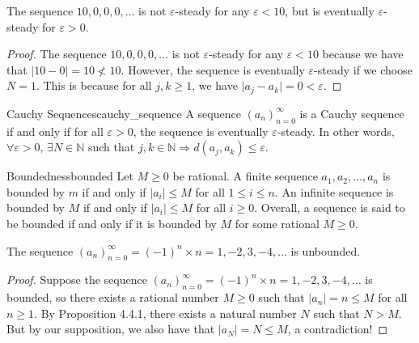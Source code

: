 \begin{proposition}
    The sequence $10, 0, 0, 0, \dots$ is not $\varepsilon$-steady for any $\varepsilon < 10$, but is eventually $\varepsilon$-steady for $\varepsilon > 0.$
\end{proposition}
\begin{proof}
    The sequence  $10, 0, 0, 0, \dots$ is not $\varepsilon$-steady for any $\varepsilon < 10$ because we have that $\lvert 10 - 0 \rvert = 10 \not < 10$.
    However, the sequence is eventually $\varepsilon$-steady if we choose $N = 1$. This is because for all $j, k \geq 1$, we have $\lvert a_j - a_k \rvert = 0 < \varepsilon.$
\end{proof}

\begin{definition}{Cauchy Sequences}{cauchy_sequence}
    A sequence $( a_n )_{n=0}^\infty$ is a Cauchy sequence if and only if for all $\varepsilon > 0$, the sequence is eventually $\varepsilon$-steady.
    In other words, $\forall \varepsilon > 0, \, \exists N \in \mathbb{N}$ such that $j, k \in \mathbb{N} \Longrightarrow d(a_j, a_k) \leq \varepsilon.$
\end{definition}

\begin{definition}{Boundedness}{bounded}
    Let $M \geq 0$ be rational. 
    A finite sequence $a_1, a_2, \dots, a_n$ is bounded by $m$ if and only if $\lvert a_i \rvert \leq M$ for all $1 \leq i \leq n.$
    An infinite sequence is bounded by $M$ if and only if $\lvert a_i \rvert \leq M$ for all $i \geq 0.$
    Overall, a sequence is said to be bounded if and only if it is bounded by $M$ for some rational $M \geq 0.$
\end{definition}
\begin{proposition}
    The sequence $(a_n )_{n=0}^\infty = (-1)^{n} \times n = 1, -2 , 3, -4, \dots$ is unbounded.
\end{proposition}
\begin{proof}
    Suppose the sequence $(a_n )_{n=0}^\infty = (-1)^{n} \times n = 1, -2 , 3, -4, \dots$ is bounded, 
    so there exists a rational number $M \geq 0$ such that $\lvert a_n \rvert = n \leq M$ for all $n \geq 1.$
    By Proposition 4.4.1, there exists a natural number $N$ such that $N > M$.
    But by our supposition, we also have that $\lvert a_N \rvert = N \leq M$, a contradiction!
\end{proof}

